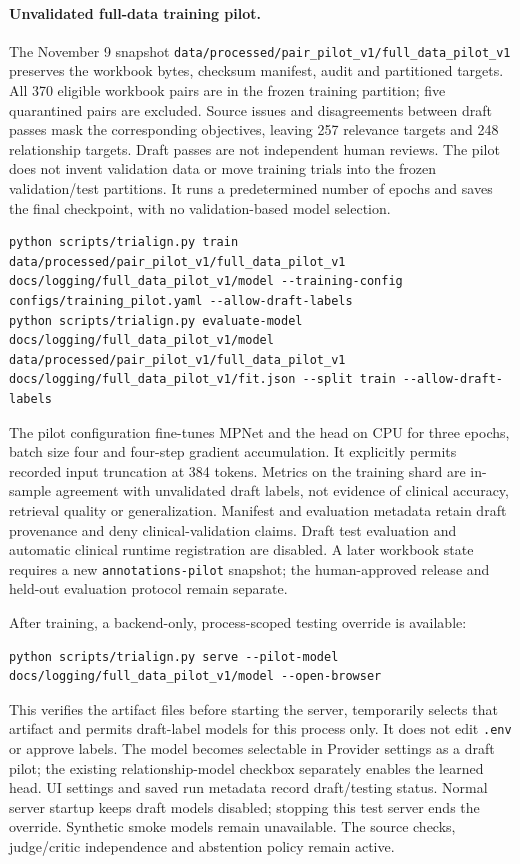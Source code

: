 \documentclass[10pt,letterpaper]{article}
\newcommand{\pathcode}[1]{\nolinkurl{#1}}
\begin{document}
\paragraph{Unvalidated full-data training pilot.}
The November 9 snapshot \pathcode{data/processed/pair_pilot_v1/full_data_pilot_v1}
preserves the workbook bytes, checksum manifest, audit and partitioned targets.
All 370 eligible workbook pairs are in the frozen training partition; five
quarantined pairs are excluded. Source issues and disagreements between draft
passes mask the corresponding objectives, leaving 257 relevance targets and
248 relationship targets. Draft passes are not independent human reviews.
The pilot does not invent validation data or move training trials into the
frozen validation/test partitions. It runs a predetermined number of epochs
and saves the final checkpoint, with no validation-based model selection.
\begin{Verbatim}[breaklines=true,fontsize=\small]
python scripts/trialign.py train data/processed/pair_pilot_v1/full_data_pilot_v1 docs/logging/full_data_pilot_v1/model --training-config configs/training_pilot.yaml --allow-draft-labels
python scripts/trialign.py evaluate-model docs/logging/full_data_pilot_v1/model data/processed/pair_pilot_v1/full_data_pilot_v1 docs/logging/full_data_pilot_v1/fit.json --split train --allow-draft-labels
\end{Verbatim}
The pilot configuration fine-tunes MPNet and the head on CPU for three epochs,
batch size four and four-step gradient accumulation. It explicitly permits
recorded input truncation at 384 tokens. Metrics on the training shard are
in-sample agreement with unvalidated draft labels, not evidence of clinical
accuracy, retrieval quality or generalization. Manifest and evaluation metadata
retain draft provenance and deny clinical-validation claims. Draft test
evaluation and automatic clinical runtime registration are disabled. A later workbook
state requires a new \pathcode{annotations-pilot} snapshot; the human-approved
release and held-out evaluation protocol remain separate.

After training, a backend-only, process-scoped testing override is available:
\begin{Verbatim}[breaklines=true,fontsize=\small]
python scripts/trialign.py serve --pilot-model docs/logging/full_data_pilot_v1/model --open-browser
\end{Verbatim}
This verifies the artifact files before starting the server, temporarily selects
that artifact and permits draft-label models for this process only. It does not
edit \pathcode{.env} or approve labels. The model becomes selectable in Provider
settings as a draft pilot; the existing relationship-model checkbox separately
enables the learned head. UI settings and saved run metadata record draft/testing
status. Normal server startup keeps draft models disabled; stopping this test
server ends the override. Synthetic smoke models remain unavailable. The source
checks, judge/critic independence and abstention policy remain active.
\end{document}
